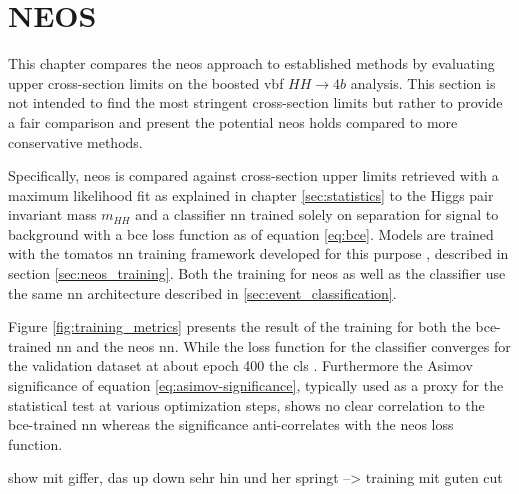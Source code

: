 \chapter{NEOS}
This chapter compares the \ac{neos} approach to established methods by evaluating upper cross-section limits on the boosted \ac{vbf} $HH\rightarrow4b$ analysis. This section is not intended to find the most stringent cross-section limits but rather to provide a fair comparison and present the potential \ac{neos} holds compared to more conservative methods.

Specifically, \ac{neos} is compared against cross-section upper limits retrieved with a maximum likelihood fit as explained in chapter \ref{sec:statistics} to the Higgs pair invariant mass $m_{HH}$ and a classifier \ac{nn} trained solely on separation for signal to background with a \ac{bce} loss function as of equation \ref{eq:bce}. Models are trained with the \ac{tomatos} \ac{nn} training framework developed for this purpose \citep{tomatos}, described in section \ref{sec:neos_training}. Both the training for \ac{neos} as well as the classifier use the same \ac{nn} architecture described in \ref{sec:event_classification}.

Figure \ref{fig:training_metrics} presents the result of the training for both the \ac{bce}-trained \ac{nn} and the neos \ac{nn}. While the loss function for the classifier converges for the validation dataset at about epoch 400 the cls . Furthermore the Asimov significance of equation \ref{eq:asimov-significance}, typically used as a proxy for the statistical test at various optimization steps, shows no clear correlation to the \ac{bce}-trained \ac{nn} whereas the significance anti-correlates with the \ac{neos} loss function.




show mit giffer, das up down sehr hin und her springt --> training mit guten cut 

